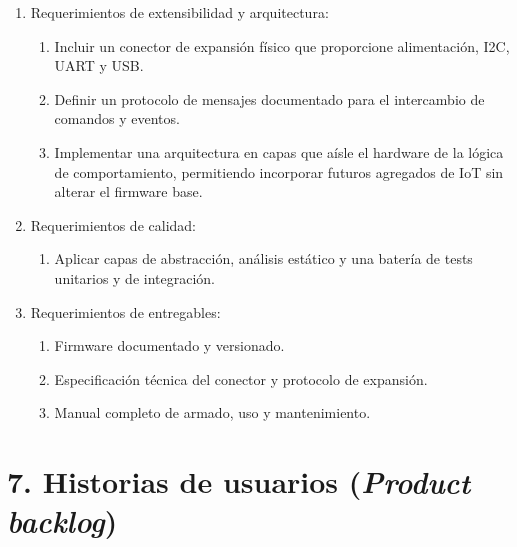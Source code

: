 \documentclass[
11pt, %
]{charter}
\begin{document}
\begin{enumerate}
\begin{enumerate}
			\item El sistema debe operar mediante una máquina de estados para gestionar las expresiones (reposo, saludo, sorpresa, dormido).
			\item Contar con una pantalla de 4 a 5 pulgadas para la animación de ojos y expresiones.
			\item Contar con un cuello de dos ejes con servos con realimentación.
			\item Conectar el sensor de presencia y los subsistemas mediante protocolos como I2C o UART.
			\item Enviar telemetría hacia una PC o placa Linux para visualizar en un monitor lateral las tareas, el estado, el tráfico de los buses y las detecciones de IA en vivo.
		\end{enumerate}
	\item Requerimientos de extensibilidad y arquitectura:
		\begin{enumerate}
			\item Incluir un conector de expansión físico que proporcione alimentación, I2C, UART y USB.
			\item Definir un protocolo de mensajes documentado para el intercambio de comandos y eventos.
			\item Implementar una arquitectura en capas que aísle el hardware de la lógica de comportamiento, permitiendo incorporar futuros agregados de IoT sin alterar el firmware base.
		\end{enumerate}
	\item Requerimientos de calidad:
		\begin{enumerate}
			\item Aplicar capas de abstracción, análisis estático y una batería de tests unitarios y de integración.
		\end{enumerate}
	\item Requerimientos de entregables:
		\begin{enumerate}
			\item Firmware documentado y versionado.
			\item Especificación técnica del conector y protocolo de expansión.
			\item Manual completo de armado, uso y mantenimiento.
		\end{enumerate}
\end{enumerate}

\section{7. Historias de usuarios (\textit{Product backlog})}
\label{sec:backlog}
\end{document}
